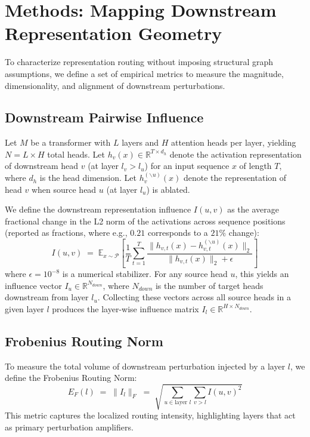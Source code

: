 \documentclass[11pt,a4paper]{article}
\newcommand{\E}{\mathbb{E}}
\theoremstyle{definition}
\theoremstyle{plain}
\begin{document}
\section{Methods: Mapping Downstream Representation Geometry}
\label{sec:methods}

To characterize representation routing without imposing structural graph assumptions, we define a set of empirical metrics to measure the magnitude, dimensionality, and alignment of downstream perturbations.

\subsection{Downstream Pairwise Influence}
Let $M$ be a transformer with $L$ layers and $H$ attention heads per layer, yielding $N = L \times H$ total heads. Let $h_v(x) \in \mathbb{R}^{T \times d_h}$ denote the activation representation of downstream head $v$ (at layer $l_v > l_u$) for an input sequence $x$ of length $T$, where $d_h$ is the head dimension. Let $h_v^{(\backslash u)}(x)$ denote the representation of head $v$ when source head $u$ (at layer $l_u$) is ablated. 

We define the downstream representation influence $I(u, v)$ as the average fractional change in the L2 norm of the activations across sequence positions (reported as fractions, where e.g., $0.21$ corresponds to a $21\%$ change):
\begin{equation}
    I(u, v) \;=\; \E_{x \sim \mathcal{P}} \left[ \frac{1}{T} \sum_{t=1}^T \frac{\|h_{v, t}(x) - h_{v, t}^{(\backslash u)}(x)\|_2}{\|h_{v, t}(x)\|_2 + \epsilon} \right]
    \label{eq:influence}
\end{equation}
where $\epsilon = 10^{-8}$ is a numerical stabilizer. For any source head $u$, this yields an influence vector $I_u \in \mathbb{R}^{N_{down}}$, where $N_{down}$ is the number of target heads downstream from layer $l_u$. Collecting these vectors across all source heads in a given layer $l$ produces the layer-wise influence matrix $I_l \in \mathbb{R}^{H \times N_{down}}$.

\subsection{Frobenius Routing Norm}
To measure the total volume of downstream perturbation injected by a layer $l$, we define the Frobenius Routing Norm:
\begin{equation}
    E_{F}(l) \;=\; \|I_l\|_F \;=\; \sqrt{\sum_{u \in \text{layer } l} \sum_{v > l} I(u, v)^2}
    \label{eq:frobenius}
\end{equation}
This metric captures the localized routing intensity, highlighting layers that act as primary perturbation amplifiers.
\end{document}
